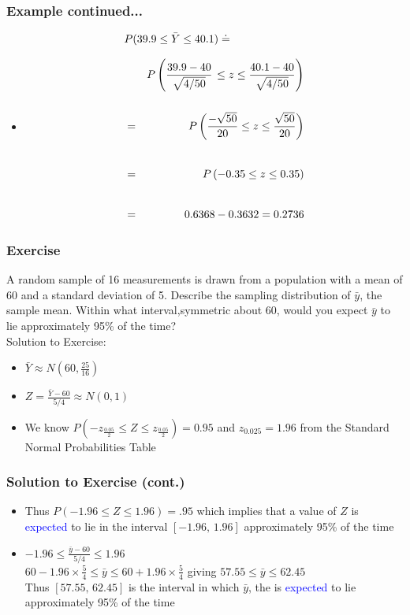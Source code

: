 \documentclass[xcolor=dvipsnames,12pt]{beamer}
\begin{document}
\begin{frame}
\frametitle{Example continued...}
\begin{itemize}
\item[b)]  
\begin{eqnarray*}
\lefteqn{P(39.9 \leq \bar{Y} \leq 40.1)  \doteq }\\[.1in]
& & P\left(\frac{39.9-40}{\sqrt{4/50}}\right. 
 \left.\leq z \leq \frac{40.1-40}{\sqrt{4/50}}\right) \\[.2in]
   & = & P\left(\frac{-\sqrt{50}}{20} \leq z \leq 
       \frac{\sqrt{50}}{20}\right) \\[.3in]
   & = & P\left(-0.35 \leq z \leq 0.35\right) \\[.3in]
      & = & 0.6368-0.3632=0.2736
\end{eqnarray*}
\end{itemize}
\end{frame}



\begin{frame}
\frametitle{Exercise }
 A random sample of 16 measurements
is drawn from a population with a mean of 60 and a standard deviation of 5. 
Describe the sampling distribution of $\bar{y}$, the sample
mean.  Within what interval,symmetric about 60, would you expect 
$\bar{y}$ to lie approximately 95\% of the time?\\[.1in]
 Solution to Exercise:
\begin{itemize}
\item $\bar{Y} \approx N(60, \frac{25}{16})$ 
\item $Z = \frac{\bar{Y}-60}{5/4} \approx N(0,1)$ 
\item We know $P(-z_{\frac{0.05}{2}} \leq Z \leq z_{\frac{0.05}{2}}) =
         0.95$ and $ z_{0.025} = 1.96$ \quad from the Standard Normal Probabilities Table
\end{itemize}
\end{frame}

\begin{frame}
\frametitle{Solution to Exercise (cont.)}
\begin{itemize}
\item Thus  $P(-1.96 \leq Z \leq 1.96) =.95$ which implies that a value of $Z$ 
is \textcolor{blue}{expected} to lie in the interval $[-1.96, \, 1.96]$ approximately 95\% of the time
\item $-1.96 \leq \frac{\bar{y}-60}{5/4} \leq 1.96$ \\[.1in]
\hspace*{.5in} $60 - 1.96 \times \frac54 \leq \bar{y} \leq 60 +
             1.96 \times \frac54$ giving $57.55 \leq \bar{y} \leq 62.45$\\[.1in]
\hspace*{.5in} Thus $[57.55, \, 62.45]$ is the interval in which $\bar{y}$, the  is \textcolor{blue}{expected} to lie approximately 95\% of the time
\end{itemize}
\end{frame}
\end{document}
